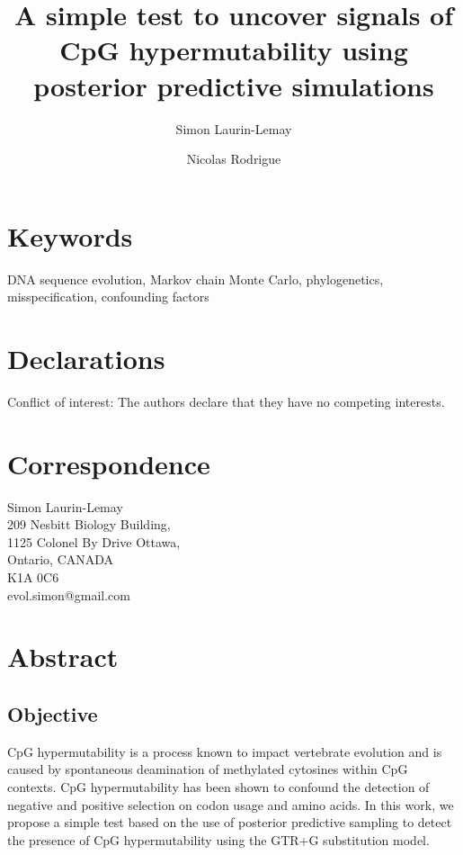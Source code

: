 \documentclass{article}
\begin{document}
\title{A simple test to uncover signals of CpG hypermutability using posterior predictive simulations}
\author[1]{Simon Laurin-Lemay}
\author[1,2,3]{Nicolas Rodrigue}
\date{}
\maketitle
\section*{Keywords}
DNA sequence evolution, Markov chain Monte Carlo, phylogenetics, misspecification, confounding factors
\section*{Declarations}
Conflict of interest: The authors declare that they have no competing
interests.
\section*{Correspondence}
Simon Laurin-Lemay\\
209 Nesbitt Biology Building,\\
1125 Colonel By Drive Ottawa,\\
Ontario, CANADA\\
K1A 0C6\\
evol.simon@gmail.com\\
\clearpage
\doublespacing

\section*{Abstract}
\subsection*{Objective}
CpG hypermutability is a process known to impact vertebrate evolution and is caused by spontaneous deamination of methylated cytosines within CpG contexts.  CpG hypermutability has been shown to confound the detection of negative and positive selection on codon usage and amino acids.  In this work, we propose a simple test based on the use of posterior predictive sampling to detect the presence of CpG hypermutability using the GTR+G substitution model.
\end{document}
